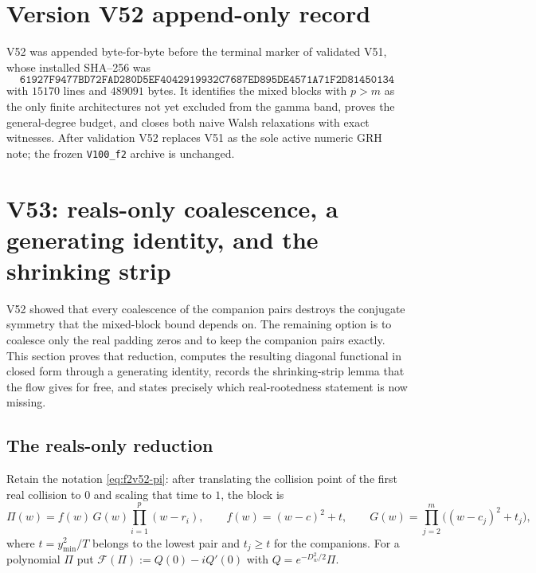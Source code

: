 \documentclass[11pt]{article}
\theoremstyle{definition}
\theoremstyle{remark}
\begin{document}
\section*{Version V52 append-only record}

V52 was appended byte-for-byte before the terminal marker of validated
V51, whose installed SHA--256 was
\[
 \texttt{61927F9477BD72FAD280D5EF40429199}
 \allowbreak\texttt{32C7687ED895DE4571A71F2D81450134}
\]
with \(15170\) lines and \(489091\) bytes.  It identifies the mixed
blocks with \(p>m\) as the only finite architectures not yet excluded
from the gamma band, proves the general-degree budget, and closes both
naive Walsh relaxations with exact witnesses.  After validation V52
replaces V51 as the sole active numeric GRH note; the frozen
\texttt{V100\_f2} archive is unchanged.





\clearpage
\section{V53: reals-only coalescence, a generating identity, and the shrinking strip}
\label{sec:f2v53-reals-only}
\begingroup
\setcounter{equation}{0}
\renewcommand{\theequation}{N53.\arabic{equation}}
\renewcommand{\theHequation}{f2v53.\arabic{equation}}

V52 showed that every coalescence of the companion pairs destroys the
conjugate symmetry that the mixed-block bound depends on.  The remaining
option is to coalesce only the real padding zeros and to keep the
companion pairs exactly.  This section proves that reduction, computes the
resulting diagonal functional in closed form through a generating
identity, records the shrinking-strip lemma that the flow gives for free,
and states precisely which real-rootedness statement is now missing.

\subsection{The reals-only reduction}

Retain the notation \eqref{eq:f2v52-pi}: after translating the collision
point of the first real collision to \(0\) and scaling that time to
\(1\), the block is
\begin{equation}
 \Pi(w)=f(w)\,G(w)\prod_{i=1}^p(w-r_i),\qquad
 f(w)=(w-c)^2+t,\qquad
 G(w)=\prod_{j=2}^m\bigl((w-c_j)^2+t_j\bigr),
 \label{eq:f2v53-pi}
\end{equation}
where \(t=y_{\min}^2/T\) belongs to the lowest pair and \(t_j\ge t\) for
the companions.  For a polynomial \(\Pi\) put
\(\mathcal F(\Pi):=Q(0)-iQ'(0)\) with \(Q=e^{-D_w^2/2}\Pi\).
\end{document}
